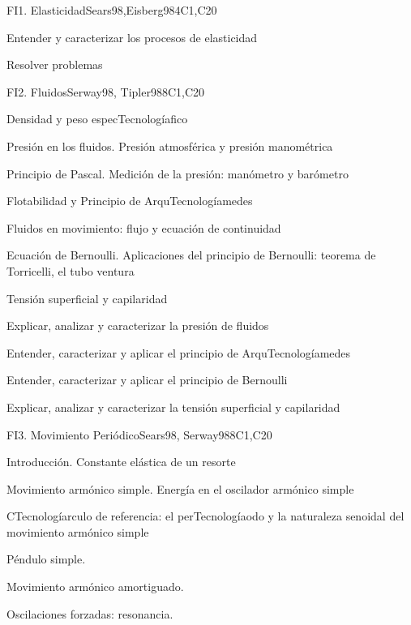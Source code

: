 \begin{syllabus}
\begin{unit}{FI1. Elasticidad}{}{Sears98,Eisberg98}{4}{C1,C20}
   \begin{learningoutcomes}
         \item  Entender y caracterizar los procesos de elasticidad
         \item  Resolver problemas
   \end{learningoutcomes}
\end{unit}

\begin{unit}{FI2. Fluidos}{Serway98, Tipler98}{}{8}{C1,C20}
\begin{topics}
         \item  Densidad y peso especTecnologíafico
	 \item  Presión en los fluidos. Presión atmosférica y presión manométrica
         \item  Principio de Pascal. Medición de la presión: manómetro y barómetro
	 \item  Flotabilidad y Principio de ArquTecnologíamedes
         \item  Fluidos en movimiento: flujo y ecuación de continuidad
	 \item  Ecuación de Bernoulli. Aplicaciones del principio de Bernoulli: teorema de Torricelli, el tubo ventura
         \item  Tensión superficial y capilaridad
   \end{topics}

   \begin{learningoutcomes}
         \item  Explicar, analizar y caracterizar la presión de fluidos
         \item  Entender, caracterizar y aplicar el principio de ArquTecnologíamedes
         \item  Entender, caracterizar y aplicar el principio de Bernoulli
         \item  Explicar, analizar y caracterizar la tensión superficial y capilaridad
   \end{learningoutcomes}
\end{unit}

\begin{unit}{FI3. Movimiento Periódico}{Sears98, Serway98}{}{8}{C1,C20}
\begin{topics}
         \item  Introducción. Constante elástica de un resorte
	 \item  Movimiento armónico simple. Energía en el oscilador armónico simple
         \item  CTecnologíarculo de referencia: el perTecnologíaodo y la naturaleza senoidal del movimiento armónico simple
	 \item  Péndulo simple.
         \item  Movimiento armónico amortiguado.
         \item  Oscilaciones forzadas: resonancia.
   \end{topics}


\end{unit}
\end{syllabus}
